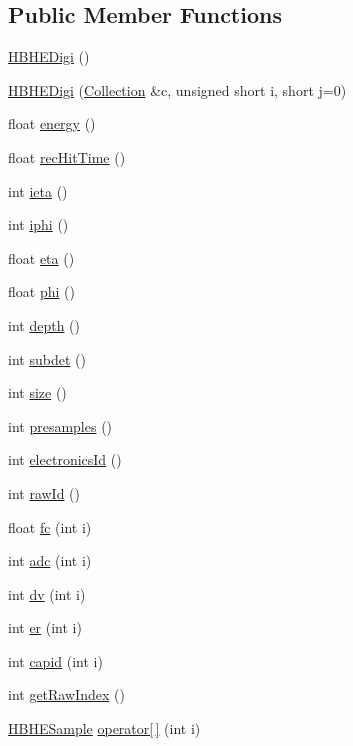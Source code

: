 \subsection*{Public Member Functions}
\begin{DoxyCompactItemize}
\item 
\hyperlink{class_h_b_h_e_digi_ac4c70373431b860ab1b599905714343b}{H\+B\+H\+E\+Digi} ()
\item 
\hyperlink{class_h_b_h_e_digi_a35d6f6074781a2d0ec2ce357d24cb11e}{H\+B\+H\+E\+Digi} (\hyperlink{class_collection}{Collection} \&c, unsigned short i, short j=0)
\item 
float \hyperlink{class_h_b_h_e_digi_a0f5025749bcd77805e199893f22a3e68}{energy} ()
\item 
float \hyperlink{class_h_b_h_e_digi_aecd2a59dcb215797ba559c75da4cd2f4}{rec\+Hit\+Time} ()
\item 
int \hyperlink{class_h_b_h_e_digi_af21f90b00a2f6426b1a9fcdb9dc6df19}{ieta} ()
\item 
int \hyperlink{class_h_b_h_e_digi_a298eb50c54fa265c3b54da98273582e8}{iphi} ()
\item 
float \hyperlink{class_h_b_h_e_digi_ac916697a2097f0fa62cf22ef53aeddf6}{eta} ()
\item 
float \hyperlink{class_h_b_h_e_digi_a4378c44b806a6c52b42bf45a15d958c0}{phi} ()
\item 
int \hyperlink{class_h_b_h_e_digi_adb9be00df4f0020f7cd1fc40c3a84b3c}{depth} ()
\item 
int \hyperlink{class_h_b_h_e_digi_aa9e095b62d3f54e4be6dc8b1a9414a4a}{subdet} ()
\item 
int \hyperlink{class_h_b_h_e_digi_ae86275760fadb4c34a6a2371b71c7c99}{size} ()
\item 
int \hyperlink{class_h_b_h_e_digi_a8b5ebee824decc29577614aba1b1a6cf}{presamples} ()
\item 
int \hyperlink{class_h_b_h_e_digi_a2a7ab522d25e2441b7e9f42a14c8a28e}{electronics\+Id} ()
\item 
int \hyperlink{class_h_b_h_e_digi_a09aaedd7443322629a9acb7bff896a50}{raw\+Id} ()
\item 
float \hyperlink{class_h_b_h_e_digi_a6048dac0f0c0267c52355a5284cef7e4}{fc} (int i)
\item 
int \hyperlink{class_h_b_h_e_digi_a13245b123aa2a7b9a77783ef063a2e9e}{adc} (int i)
\item 
int \hyperlink{class_h_b_h_e_digi_a1dad223a353a80ebf729ece94d4a40ed}{dv} (int i)
\item 
int \hyperlink{class_h_b_h_e_digi_a4a0513d9ad713c7043c532bdd806fb1e}{er} (int i)
\item 
int \hyperlink{class_h_b_h_e_digi_ab1ae8ad47951f6368763a4c29cbf2412}{capid} (int i)
\item 
int \hyperlink{class_h_b_h_e_digi_a7c3890054c40ebfeafb5f83d0fad4b31}{get\+Raw\+Index} ()
\item 
\hyperlink{class_h_b_h_e_sample}{H\+B\+H\+E\+Sample} \hyperlink{class_h_b_h_e_digi_abe944356d1568a368d2f48053eb57316}{operator\mbox{[}$\,$\mbox{]}} (int i)
\end{DoxyCompactItemize}
